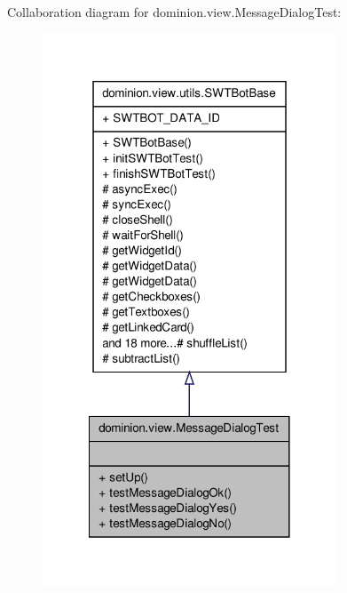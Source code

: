\-Collaboration diagram for dominion.\-view.\-Message\-Dialog\-Test\-:
\nopagebreak
\begin{figure}[H]
\begin{center}
\leavevmode
\includegraphics[width=248pt]{classdominion_1_1view_1_1MessageDialogTest__coll__graph}
\end{center}
\end{figure}
